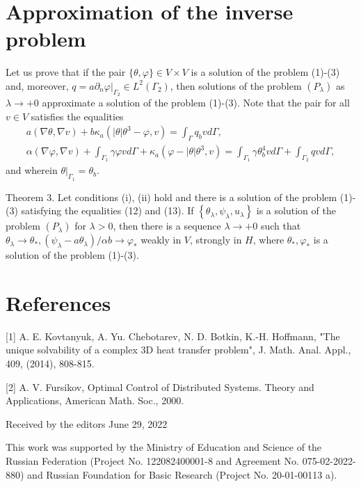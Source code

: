 \documentclass[10pt]{article}
\begin{document}
\section{Approximation of the inverse problem}
Let us prove that if the pair $\{\theta, \varphi\} \in V \times V$ is a solution of the problem (1)-(3) and, moreover, $q=\left.a \partial_{n} \varphi\right|_{\Gamma_{2}} \in L^{2}\left(\Gamma_{2}\right)$, then solutions of the problem $\left(P_{\lambda}\right)$ as $\lambda \rightarrow+0$ approximate a solution of the problem (1)-(3). Note that the pair for all $v \in V$ satisfies the equalities
$$
\begin{gathered}
a(\nabla \theta, \nabla v)+b \kappa_{a}\left(|\theta| \theta^{3}-\varphi, v\right)=\int_{\Gamma} q_{b} v d \Gamma, \\
\alpha(\nabla \varphi, \nabla v)+\int_{\Gamma_{1}} \gamma \varphi v d \Gamma+\kappa_{a}\left(\varphi-|\theta| \theta^{3}, v\right)=\int_{\Gamma_{1}} \gamma \theta_{b}^{4} v d \Gamma+\int_{\Gamma_{2}} q v d \Gamma,
\end{gathered}
$$
and wherein $\left.\theta\right|_{\Gamma_{1}}=\theta_{b}$.

Theorem 3. Let conditions (i), (ii) hold and there is a solution of the problem (1)-(3) satisfying the equalities (12) and (13). If $\left\{\theta_{\lambda}, \psi_{\lambda}, u_{\lambda}\right\}$ is a solution of the problem $\left(P_{\lambda}\right)$ for $\lambda>0$, then there is a sequence $\lambda \rightarrow+0$ such that $\theta_{\lambda} \rightarrow \theta_{*},\left(\psi_{\lambda}-a \theta_{\lambda}\right) / \alpha b \rightarrow \varphi_{*}$ weakly in $V$, strongly in $H$, where $\theta_{*}, \varphi_{*}$ is a solution of the problem (1)-(3).

\section{References}
[1] A. E. Kovtanyuk, A. Yu. Chebotarev, N. D. Botkin, K.-H. Hoffmann, "The unique solvability of a complex 3D heat transfer problem", J. Math. Anal. Appl., 409, (2014), 808-815.

[2] A. V. Fursikov, Optimal Control of Distributed Systems. Theory and Applications, American Math. Soc., 2000.

Received by the editors June 29, 2022

This work was supported by the Ministry of Education and Science of the Russian Federation (Project No. 122082400001-8 and Agreement No. 075-02-2022-880) and Russian Foundation for Basic Research (Project No. 20-01-00113 a).
\end{document}
